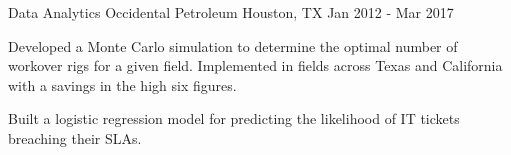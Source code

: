 \begin{cventries}

\cventry
{Data Analytics} %
{Occidental Petroleum} %
{Houston, TX} %
{Jan 2012 - Mar 2017} %
{ %
\begin{cvitems}
\item {Developed a Monte Carlo simulation to determine the optimal number of workover rigs for a given field. Implemented in fields across Texas and California with a savings in the high six figures.}
\item {Built a logistic regression model for predicting the likelihood of IT tickets breaching their SLAs.}
\end{cvitems}
}


\end{cventries}
